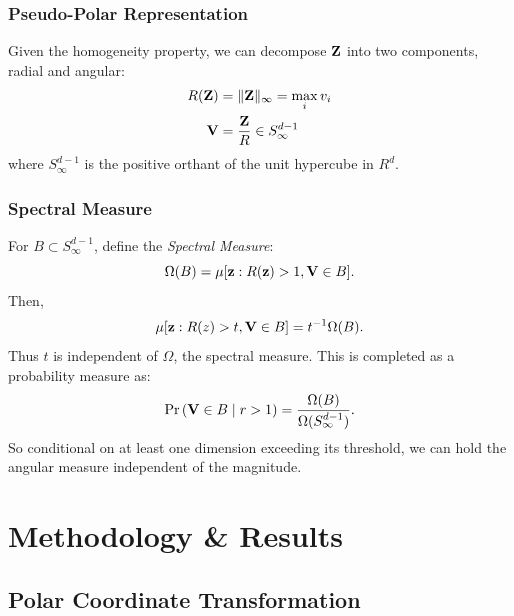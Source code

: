 \documentclass[aspectratio=169]{beamer}
\begin{document}
\begin{frame}
  \frametitle{Pseudo-Polar Representation}
  Given the homogeneity property, we can decompose ${\bf Z}$ into two components, radial and angular:
    \begin{equation*}
      \begin{aligned}
        R({\bf Z}) &= \lVert {\bf Z}\rVert_{\infty} = \max_i v_i\\
        {\bf V} &= \frac{{\bf Z}}{R} \in S_{\infty}^{d-1}
      \end{aligned}
    \end{equation*}
  where $S_{\infty}^{d-1}$ is the positive orthant of the unit hypercube in $R^d$.
\end{frame}

\begin{frame}
  \frametitle{Spectral Measure}
  For $B \subset S_{\infty}^{d-1}$, define the \emph{Spectral Measure}:
  \begin{equation*}
    \Omega(B) = \mu[{\bf z}: R({\bf z}) > 1, {\bf V} \in B].
  \end{equation*}
  Then,
  \begin{equation*}
    \mu[{\bf z}:R(z)>t, {\bf V}\in B] = t^{-1}\Omega(B).
  \end{equation*}
  Thus $t$ is independent of $\Omega$, the spectral measure.  This is completed as a
    probability measure as:
  \begin{equation*}
    \text{Pr}\left({\bf V} \in B \mid r > 1\right) = \frac{\Omega(B)}{\Omega(S_{\infty}^{d-1})}.
  \end{equation*}
  So conditional on at least one dimension exceeding its threshold, we can hold the
  angular measure independent of the magnitude.
\end{frame}

\section{Methodology \& Results}

\subsection{Polar Coordinate Transformation}
\end{document}
